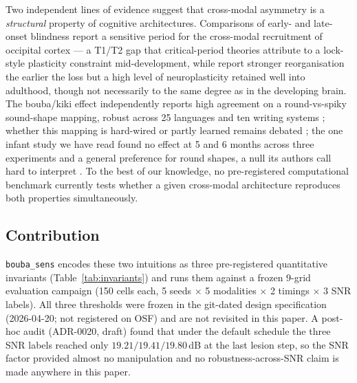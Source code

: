 \documentclass{article}
\begin{document}
Two independent lines of evidence suggest that cross-modal
asymmetry is a \emph{structural} property of cognitive
architectures. Comparisons of early- and late-onset blindness
report a sensitive period for the cross-modal recruitment of
occipital cortex \citep{cohen1999period, sadato2002critical, collignon2013impact} ---
a T1/T2 gap that critical-period theories
\citep{bavelier2002cross} attribute to a
lock-style plasticity constraint mid-development, while
\citet{merabet2010neural} report stronger reorganisation the
earlier the loss but a high level of neuroplasticity retained well
into adulthood, though not necessarily to the same degree as in
the developing brain.
The bouba/kiki
effect \citep{kohler1947gestalt, ramachandran2001synaesthesia}
independently reports high agreement on a round-vs-spiky
sound-shape mapping, robust across 25 languages and ten writing
systems \citep{cwiek2022bouba}; whether this mapping is hard-wired
or partly learned remains debated \citep{sidhu2018five}; the one
infant study we have read found no effect at 5 and 6 months across
three experiments and a general preference for round shapes, a null
its authors call hard to interpret \citep{fort2013looking}. To the
best of our knowledge, no pre-registered computational benchmark
currently tests whether a given cross-modal architecture
reproduces both properties simultaneously.

\subsection{Contribution}
\label{sec:contribution}

\texttt{bouba\_sens} encodes these two intuitions as three
pre-registered quantitative invariants (Table~\ref{tab:invariants})
and runs them against a frozen 9-grid evaluation campaign
(150 cells each, 5 seeds $\times$ 5 modalities $\times$ 2
timings $\times$ 3 SNR labels). All three thresholds were frozen in the
git-dated design specification (2026-04-20; not registered on OSF)
and are not revisited in this paper. A post-hoc audit (ADR-0020,
draft) found that
under the default schedule the three SNR labels reached only
$19.21 / 19.41 / 19.80$\,dB at the last lesion step, so the SNR factor
provided almost no manipulation and no robustness-across-SNR claim is
made anywhere in this paper.
\end{document}
